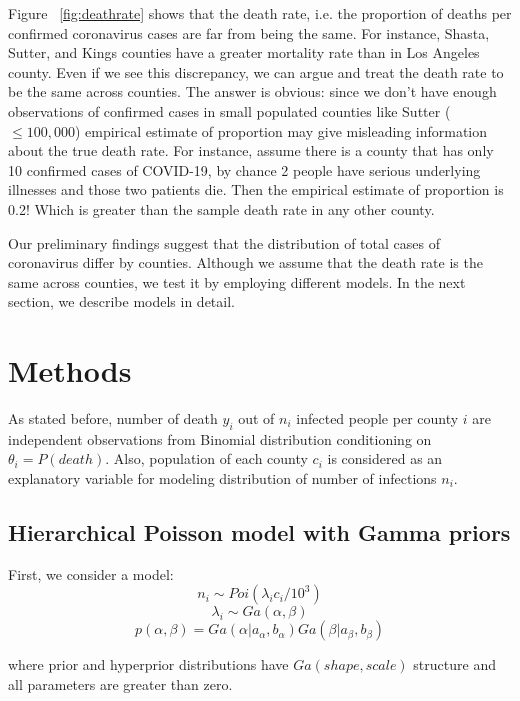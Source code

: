 \documentclass[11pt,twocolumn]{asaproc}
\begin{document}
Figure ~\ref{fig:deathrate} shows that the death rate, i.e. the proportion of deaths per confirmed coronavirus cases are far from being the same. For instance, Shasta, Sutter, and Kings counties have a greater mortality rate than in Los Angeles county. Even if we see this discrepancy, we can argue and treat the death rate to be the same across counties. The answer is obvious: since we don't have enough observations of confirmed cases in small populated counties like Sutter ($\leq 100,000$) empirical estimate of proportion may give misleading information about the true death rate. For instance, assume there is a county that has only 10 confirmed cases of COVID-19, by chance 2 people have serious underlying illnesses and those two patients die. Then the empirical estimate of proportion is 0.2! Which is greater than the sample death rate in any other county. 

Our preliminary findings suggest that the distribution of total cases of coronavirus differ by counties. Although we assume that the death rate is the same across counties, we test it by employing different models. In the next section, we describe models in detail.








\section{Methods}

As stated before, number of death $y_i$ out of $n_i$ infected people per county $i$ are independent observations from Binomial distribution conditioning on $\theta_i = P(death)$. Also, population of each county $c_i$ is considered as an explanatory variable for modeling distribution of number of infections $n_i$. 



\subsection{Hierarchical Poisson model with Gamma priors}
First, we consider a model: 
$$n_i \sim Poi(\lambda_i c_i/10^3)$$
$$\lambda_i \sim Ga(\alpha, \beta)$$
$$p(\alpha, \beta) = Ga(\alpha |a_{\alpha}, b_{\alpha})Ga(\beta | a_{\beta}, b_{\beta})$$

where prior and hyperprior distributions have $Ga(shape, scale)$ structure and all parameters are greater than zero. 
\end{document}

